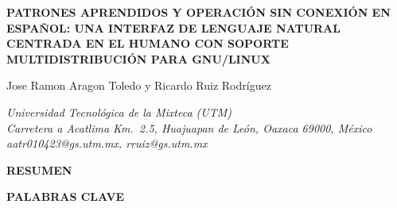 \documentclass[10pt,a4paper]{article}
\begin{document}
\renewcommand{\tablename}{Tabla}
\renewcommand{\figurename}{Figura}

{
\raggedright
\fontsize{16}{19.2}\bfseries
PATRONES APRENDIDOS Y OPERACIÓN SIN CONEXIÓN EN
ESPAÑOL: UNA INTERFAZ DE LENGUAJE NATURAL CENTRADA
EN EL HUMANO CON SOPORTE MULTIDISTRIBUCIÓN PARA
GNU/LINUX\par
\vspace{24pt}
}

{
\raggedright
\fontsize{11}{13.2}\selectfont
Jose Ramon Aragon Toledo y Ricardo Ruiz Rodr\'{i}guez\par
\vspace{6pt}
\fontsize{9}{10.8}\itshape
Universidad Tecnol\'{o}gica de la Mixteca (UTM)\\
Carretera a Acatlima Km.\ 2.5, Huajuapan de Le\'{o}n, Oaxaca 69000, M\'{e}xico\\
aatr010423@gs.utm.mx, rruiz@gs.utm.mx\par
}

\vspace{42pt}

{
\noindent\fontsize{9}{10.8}\bfseries RESUMEN\par
\vspace{6pt}
\normalfont\fontsize{9}{10.8}\selectfont
\noindent

\par
}

\vspace{18pt}

{
\noindent\fontsize{9}{10.8}\bfseries PALABRAS CLAVE\par
\vspace{6pt}
\normalfont\fontsize{10}{12}\selectfont
\noindent

\par
}

\vspace{12pt}









{
\fontsize{9}{10.8}\selectfont
\setlength{\bibsep}{2pt}

}
\end{document}

